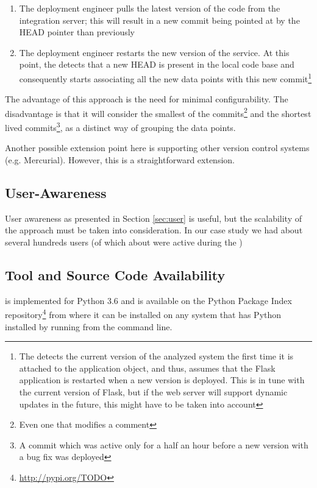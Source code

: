 \documentclass[conference]{IEEEtran}
\begin{document}
  \begin{enumerate}
    \item The deployment engineer pulls the latest version of the code from the integration server; this will result in a new commit being pointed at by the HEAD pointer than previously
    \item The deployment engineer restarts the new version of the service. At this point, the \tool detects that a new HEAD is present in the local code base and consequently starts associating all the new data points with this new commit\footnote{The \tool detects the current version of the analyzed system the first time it is attached to the application object, and thus, assumes that the Flask application is restarted when a new version is deployed. This is in tune with the current version of Flask, but if the web server will support dynamic updates in the future, this might have to be taken into account}
  \end{enumerate}

  The advantage of this approach is the need for minimal configurability. The disadvantage is that it will consider the smallest of the commits\footnote{Even one that modifies a comment} and the shortest lived commits\footnote{A commit which was active only for a half an hour before a new version with a bug fix was deployed}, as a distinct way of grouping the data points. 

  Another possible extension point here is supporting other version control systems (e.g. Mercurial). However, this is a straightforward extension.



  \subsection{User-Awareness }

    User awareness as presented in Section \ref{sec:user} is useful, but the scalability of the approach must be taken into consideration. In our case study we had about several hundreds users (of which about \activeUserCount were active during the ) 



  \subsection{Tool and Source Code Availability}
  \label{sec:install}

    \tool is implemented for Python 3.6 and is available on the Python Package Index repository\footnote{\url{http://pypi.org/TODO}} from where it can be installed on any system that has Python installed by running \install from the command line. 
\end{document}
